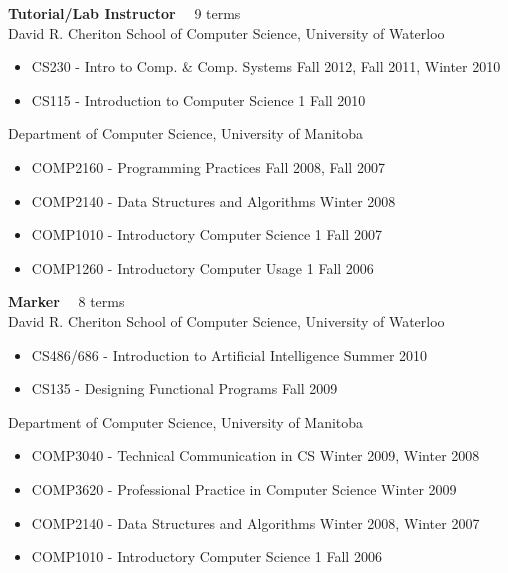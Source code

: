 \documentclass[line,margin]{res}
\begin{document}
\begin{resume}
  {\bf Tutorial/Lab Instructor} ~~9 terms \vspace{4pt} \\
  David R. Cheriton School of Computer Science, University of Waterloo
  \begin{itemize}  \itemsep -2pt
    \item CS230 - Intro to Comp. \& Comp. Systems \hfill Fall 2012, Fall 2011, Winter 2010
    \item CS115 - Introduction to Computer Science 1 \hfill Fall 2010
  \end{itemize} \vspace{-4pt}
  Department of Computer Science, University of Manitoba
  \begin{itemize}  \itemsep -2pt
    \item COMP2160 - Programming Practices \hfill Fall 2008, Fall 2007
    \item COMP2140 - Data Structures and Algorithms \hfill Winter 2008
    \item COMP1010 - Introductory Computer Science 1 \hfill Fall 2007
    \item COMP1260 - Introductory Computer Usage 1 \hfill Fall 2006
  \end{itemize}
  
  {\bf Marker} ~~8 terms \vspace{4pt} \\
  David R. Cheriton School of Computer Science, University of Waterloo
  \begin{itemize}  \itemsep -2pt
    \item CS486/686 - Introduction to Artificial Intelligence \hfill Summer 2010
    \item CS135 - Designing Functional Programs \hfill Fall 2009
  \end{itemize} \vspace{-4pt}
  Department of Computer Science, University of Manitoba
  \begin{itemize}  \itemsep -2pt
    \item COMP3040 - Technical Communication in CS \hfill Winter 2009, Winter 2008
    \item COMP3620 - Professional Practice in Computer Science \hfill Winter 2009
    \item COMP2140 - Data Structures and Algorithms \hfill Winter 2008, Winter 2007
    \item COMP1010 - Introductory Computer Science 1 \hfill Fall 2006
  \end{itemize}


\end{resume}
\end{document}

